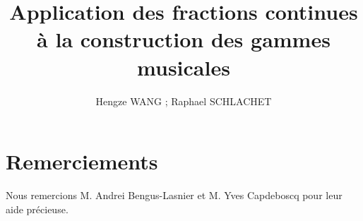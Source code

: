 \documentclass[moyen]{classeUPD}
\begin{document}
\frontmatter
{} %
\title{Application des fractions continues \`a la construction des gammes musicales} 
\author{Hengze WANG ; Raphael SCHLACHET}
\university %
\ed[L1 MIASHS] %

\makecover %
\maketitle


\backmatter
\chapter{Remerciements}

Nous remercions M. Andrei Bengus-Lasnier et M. Yves Capdeboscq pour leur aide pr\'ecieuse.

\clearpage
\tableofcontents
\clearpage

\end{document}
